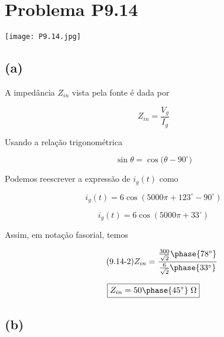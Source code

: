 



% 


\section*{Problema P9.14}

\begin{center}
    \texttt{[image: P9.14.jpg]}
\end{center}

\subsection*{(a)}

A impedância \(Z_{in}\) vista pela fonte é dada por

\begin{equation}\label{eq:9.14.1}\tag{9.14-1}
    Z_{in} = \frac{V_g}{I_g}
\end{equation}

Usando a relação trigonométrica 

\[  \sin{\theta} = \cos({\theta - 90^{\circ})}  \]

Podemos reescrever a expressão de \(i_g(t)\) como

\[ i_g(t) = 6\cos({5000\pi + 123^{\circ} - 90^{\circ}})  \]

\[ i_g(t) = 6\cos({5000\pi + 33^{\circ}})  \]

Assim, em notação fasorial, temos 

\begin{equation}\label{eq:9.14.2}\tag{9.14-2}
    Z_{in} = \frac{\frac{300}{\sqrt{2}}\phase{78^{\circ}}}{\frac{6}{\sqrt{2}}\phase{33^{\circ}}}
\end{equation}

\[ \boxed{Z_{in} = 50\phase{45^{\circ}} \; \Omega}  \]

\subsection*{(b)}


